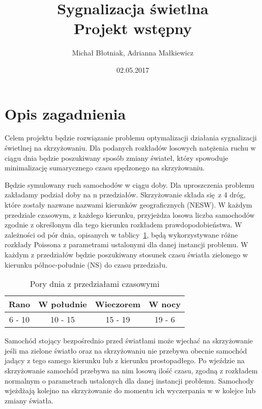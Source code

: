 \documentclass[a4paper]{article}
\title {
  Sygnalizacja świetlna
  \\ Projekt wstępny
}
\date{02.05.2017}
\author{Michał Błotniak, Adrianna Małkiewicz}
\begin{document}
\maketitle

\justify

\section{Opis zagadnienia}

Celem projektu będzie rozwiązanie problemu optymalizacji działania sygnalizacji
świetlnej na skrzyżowaniu. Dla podanych rozkładów losowych natężenia ruchu
w ciągu dnia będzie poszukiwany sposób zmiany świateł, który spowoduje
minimalizację sumarycznego czasu spędzonego na skrzyżowaniu.

Będzie symulowany ruch samochodów w ciągu doby. Dla uproszczenia problemu
zakładamy podział doby na n przedziałów. Skrzyżowanie składa się z 4 dróg, które
zostały nazwane nazwami kierunków geograficznych (NESW). W każdym przedziale
czasowym, z każdego kierunku, przyjeżdza losowa liczba samochodów zgodnie
z określonym dla tego kierunku rozkładem prawdopodobieństwa. W zależności od
pór dnia, opisanych w tablicy~\ref{tab:hours}, będą wykorzystywane różne
rozkłady Poissona z parametrami ustalonymi dla danej instancji problemu.
W każdym z przedziałów będzie poszukiwany stosunek czasu światła zielonego
w kierunku północ-południe (NS) do czasu przedziału.

\begin{table}[ht]
    \centering
    \begin{tabular}{| c | c | c | c |}
        \hline
        Rano & W południe & Wieczorem & W nocy \\ \hline
        6 - 10 & 10 - 15 & 15 - 19 & 19 - 6 \\ \hline
    \end{tabular}
    \caption{Pory dnia z przedziałami czasowymi\label{tab:hours}}
\end{table}

Samochód stojący bezpośrednio przed światłami może wjechać na skrzyżowanie
jeśli ma zielone światło oraz na skrzyżowaniu nie przebywa obecnie samochód
jadący z tego samego kierunku lub z kierunku prostopadłego. Po wjeździe na
skrzyżowanie samochód przebywa na nim losową ilość czasu, zgodną z rozkładem
normalnym o parametrach ustalonych dla danej instancji problemu. Samochody
wjeżdżają kolejno na skrzyżowanie do momentu ich wyczerpania w w kolejce
lub zmiany światła.
\end{document}
